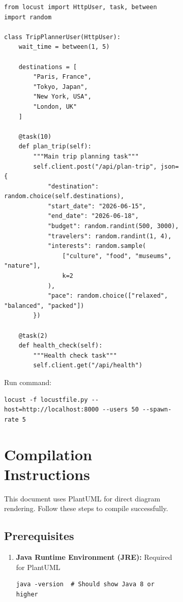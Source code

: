 \documentclass[12pt,a4paper]{report}
\begin{document}
\begin{figure}[H]
\begin{plantuml}
\begin{figure}[H]
\begin{plantuml}
\begin{lstlisting}[style=pythonstyle, caption={Load Test with Locust}]
from locust import HttpUser, task, between
import random

class TripPlannerUser(HttpUser):
    wait_time = between(1, 5)
    
    destinations = [
        "Paris, France",
        "Tokyo, Japan",
        "New York, USA",
        "London, UK"
    ]
    
    @task(10)
    def plan_trip(self):
        """Main trip planning task"""
        self.client.post("/api/plan-trip", json={
            "destination": random.choice(self.destinations),
            "start_date": "2026-06-15",
            "end_date": "2026-06-18",
            "budget": random.randint(500, 3000),
            "travelers": random.randint(1, 4),
            "interests": random.sample(
                ["culture", "food", "museums", "nature"],
                k=2
            ),
            "pace": random.choice(["relaxed", "balanced", "packed"])
        })
    
    @task(2)
    def health_check(self):
        """Health check task"""
        self.client.get("/api/health")
\end{lstlisting}

Run command:
\begin{lstlisting}[style=bashStyle]
locust -f locustfile.py --host=http://localhost:8000 --users 50 --spawn-rate 5
\end{lstlisting}


\appendix

\chapter{Compilation Instructions}
\label{appendix:compilation}

This document uses PlantUML for direct diagram rendering. Follow these steps to compile successfully.

\section{Prerequisites}

\begin{enumerate}
    \item \textbf{Java Runtime Environment (JRE):} Required for PlantUML
    \begin{lstlisting}[style=bashStyle]
java -version  # Should show Java 8 or higher
    \end{lstlisting}
    

\end{enumerate}
\end{plantuml}
\end{figure}
\end{plantuml}
\end{figure}
\end{document}
